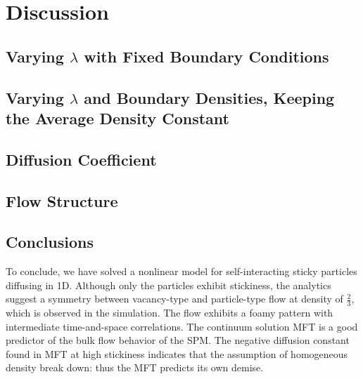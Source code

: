 \section{Discussion} \label{sec:conc}
\subsection{Varying $\lambda$ with Fixed Boundary Conditions} 

\subsection{Varying $\lambda$ and Boundary Densities, Keeping the Average Density Constant}

\subsection{Diffusion Coefficient}

\subsection{Flow Structure}

\subsection{Conclusions}
To conclude, we have solved a nonlinear model for self-interacting sticky particles diffusing in 1D.  Although only the particles exhibit stickiness,  the analytics suggest a symmetry between vacancy-type and particle-type flow
at density of $\frac{2}{3}$, which is observed in the simulation.  The flow exhibits a foamy pattern with intermediate time-and-space correlations.  The continuum solution MFT is a good predictor of the bulk flow behavior of the SPM.
The negative diffusion constant found in MFT at high stickiness indicates  that the assumption of homogeneous density break down: thus the MFT predicts its own demise.